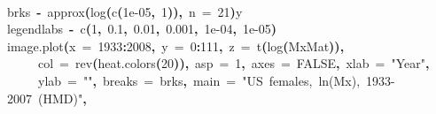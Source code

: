 \documentclass[a4paper]{article}
\newcommand{\hlnumber}[1]{\textcolor[rgb]{0.0823529411764706,0.0784313725490196,0.709803921568627}{#1}}%
\newcommand{\hlfunctioncall}[1]{\textcolor[rgb]{1,0,0}{#1}}%
\newcommand{\hlstring}[1]{\textcolor[rgb]{0.6,0.6,1}{#1}}%
\newcommand{\hlkeyword}[1]{\textcolor[rgb]{0,0,0}{\textbf{#1}}}%
\newcommand{\hlargument}[1]{\textcolor[rgb]{0.694117647058824,0.247058823529412,0.0196078431372549}{#1}}%
\newcommand{\hlassignement}[1]{\textcolor[rgb]{0.215686274509804,0.215686274509804,0.384313725490196}{\textbf{#1}}}%
\newcommand{\hlsymbol}[1]{\textcolor[rgb]{0,0,0}{#1}}%
\newcommand{\hlprompt}[1]{\textcolor[rgb]{0,0,0}{#1}}%
\newcommand{\hlstd}[1]{\textcolor[rgb]{0,0,0}{#1}}%
\newenvironment{Houtput}{\raggedright}{%
%
}
\begin{document}
\begin{Houtput}
\hspace*{\fill}\\
\hlstd{}\ttfamily\noindent
\hlprompt{\usebox{\hlnormalsizeboxgreaterthan}{\ }}\hlsymbol{brks}{\ }\hlassignement{\usebox{\hlnormalsizeboxlessthan}-}{\ }\hlfunctioncall{approx}\hlkeyword{(}\hlfunctioncall{log}\hlkeyword{(}\hlfunctioncall{c}\hlkeyword{(}\hlnumber{1e-05}\hlkeyword{,}{\ }\hlnumber{1}\hlkeyword{)}\hlkeyword{)}\hlkeyword{,}{\ }\hlargument{n}{\ }\hlargument{=}{\ }\hlnumber{21}\hlkeyword{)}\hlkeyword{\usebox{\hlnormalsizeboxdollar}}\hlsymbol{y}\mbox{}
\normalfont
\hspace*{\fill}\\
\hlstd{}\ttfamily\noindent
\hlprompt{\usebox{\hlnormalsizeboxgreaterthan}{\ }}\hlsymbol{legendlabs}{\ }\hlassignement{\usebox{\hlnormalsizeboxlessthan}-}{\ }\hlfunctioncall{c}\hlkeyword{(}\hlnumber{1}\hlkeyword{,}{\ }\hlnumber{0.1}\hlkeyword{,}{\ }\hlnumber{0.01}\hlkeyword{,}{\ }\hlnumber{0.001}\hlkeyword{,}{\ }\hlnumber{1e-04}\hlkeyword{,}{\ }\hlnumber{1e-05}\hlkeyword{)}\mbox{}
\normalfont
\hspace*{\fill}\\
\hlstd{}\ttfamily\noindent
\hlprompt{\usebox{\hlnormalsizeboxgreaterthan}{\ }}\hlfunctioncall{image.plot}\hlkeyword{(}\hlargument{x}{\ }\hlargument{=}{\ }\hlnumber{1933}\hlkeyword{:}\hlnumber{2008}\hlkeyword{,}{\ }\hlargument{y}{\ }\hlargument{=}{\ }\hlnumber{0}\hlkeyword{:}\hlnumber{111}\hlkeyword{,}{\ }\hlargument{z}{\ }\hlargument{=}{\ }\hlfunctioncall{t}\hlkeyword{(}\hlfunctioncall{log}\hlkeyword{(}\hlsymbol{MxMat}\hlkeyword{)}\hlkeyword{)}\hlkeyword{,}\hspace*{\fill}\\
\hlstd{}\hlprompt{{\ }}{\ }{\ }{\ }{\ }\hlargument{col}{\ }\hlargument{=}{\ }\hlfunctioncall{rev}\hlkeyword{(}\hlfunctioncall{heat.colors}\hlkeyword{(}\hlnumber{20}\hlkeyword{)}\hlkeyword{)}\hlkeyword{,}{\ }\hlargument{asp}{\ }\hlargument{=}{\ }\hlnumber{1}\hlkeyword{,}{\ }\hlargument{axes}{\ }\hlargument{=}{\ }\hlnumber{FALSE}\hlkeyword{,}{\ }\hlargument{xlab}{\ }\hlargument{=}{\ }\hlstring{"Year"}\hlkeyword{,}\hspace*{\fill}\\
\hlstd{}\hlprompt{{\ }}{\ }{\ }{\ }{\ }\hlargument{ylab}{\ }\hlargument{=}{\ }\hlstring{""}\hlkeyword{,}{\ }\hlargument{breaks}{\ }\hlargument{=}{\ }\hlsymbol{brks}\hlkeyword{,}{\ }\hlargument{main}{\ }\hlargument{=}{\ }\hlstring{"US{\ }females,{\ }ln(Mx),{\ }1933-2007{\ }(HMD)"}\hlkeyword{,}\hspace*{\fill}\\

\end{Houtput}
\end{document}
